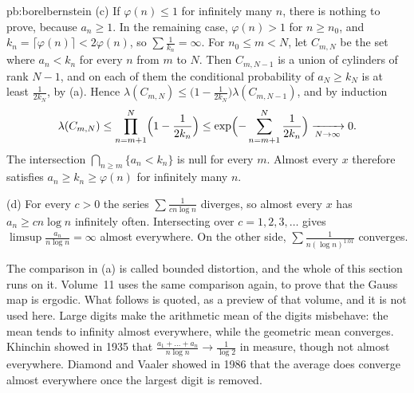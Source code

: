 \begin{solution}{pb:borelbernstein}
(c) If $\varphi(n)\le 1$ for infinitely many $n$, there is nothing to prove, because $a_n\ge 1$. In the remaining case, $\varphi(n)>1$ for $n\ge n_0$, and $k_n=\lceil\varphi(n)\rceil<2\varphi(n)$, so $\sum\frac1{k_n}=\infty$. For $n_0\le m<N$, let $C_{m,N}$ be the set where $a_n<k_n$ for every $n$ from $m$ to $N$. Then $C_{m,N-1}$ is a union of cylinders of rank $N-1$, and on each of them the conditional probability of $a_N\ge k_N$ is at least $\frac1{2k_N}$, by (a). Hence $\lambda(C_{m,N})\le\bigl(1-\frac1{2k_N}\bigr)\lambda(C_{m,N-1})$, and by induction
\[
\lambda(C_{m,N})\le\prod_{n=m+1}^N\Bigl(1-\frac1{2k_n}\Bigr)\le\exp\Bigl(-\sum_{n=m+1}^N\frac1{2k_n}\Bigr)\xrightarrow[N\to\infty]{}0.
\]
The intersection $\bigcap_{n\ge m}\{a_n<k_n\}$ is null for every $m$. Almost every $x$ therefore satisfies $a_n\ge k_n\ge\varphi(n)$ for infinitely many $n$.

(d) For every $c>0$ the series $\sum\frac1{cn\log n}$ diverges, so almost every $x$ has $a_n\ge cn\log n$ infinitely often. Intersecting over $c=1,2,3,\dots$ gives $\limsup\frac{a_n}{n\log n}=\infty$ almost everywhere. On the other side, $\sum\frac1{n(\log n)^{1.01}}$ converges.

\leads The comparison in (a) is called bounded distortion, and the whole of this section runs on it. Volume~11 uses the same comparison again, to prove that the Gauss map is ergodic. What follows is quoted, as a preview of that volume, and it is not used here. Large digits make the arithmetic mean of the digits misbehave: the mean tends to infinity almost everywhere, while the geometric mean converges. Khinchin showed in 1935 that $\frac{a_1+\dots+a_n}{n\log n}\to\frac1{\log 2}$ in measure, though not almost everywhere. Diamond and Vaaler showed in 1986 that the average does converge almost everywhere once the largest digit is removed.
\end{solution}

